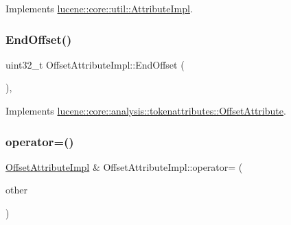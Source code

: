 Implements \mbox{\hyperlink{classlucene_1_1core_1_1util_1_1AttributeImpl_a135318ad4c7c17b3d85e625e32fb42cd}{lucene\+::core\+::util\+::\+Attribute\+Impl}}.

\mbox{\label{classlucene_1_1core_1_1analysis_1_1tokenattributes_1_1OffsetAttributeImpl_a1e70ec558f605ea2313e41ba5c64e379}} 
\subsubsection{\texorpdfstring{End\+Offset()}{EndOffset()}}
{\footnotesize\ttfamily uint32\+\_\+t Offset\+Attribute\+Impl\+::\+End\+Offset (\begin{DoxyParamCaption}{ }\end{DoxyParamCaption})\hspace{0.3cm}{\ttfamily [override]}, {\ttfamily [virtual]}}



Implements \mbox{\hyperlink{classlucene_1_1core_1_1analysis_1_1tokenattributes_1_1OffsetAttribute_ada281ff6240e1a0fecf57707329ec974}{lucene\+::core\+::analysis\+::tokenattributes\+::\+Offset\+Attribute}}.

\mbox{\label{classlucene_1_1core_1_1analysis_1_1tokenattributes_1_1OffsetAttributeImpl_ad5aee8c4731cfda2c9a1c7b7dbe4dc30}} 
\subsubsection{\texorpdfstring{operator=()}{operator=()}\hspace{0.1cm}{\footnotesize\ttfamily [1/2]}}
{\footnotesize\ttfamily \mbox{\hyperlink{classlucene_1_1core_1_1analysis_1_1tokenattributes_1_1OffsetAttributeImpl}{Offset\+Attribute\+Impl}} \& Offset\+Attribute\+Impl\+::operator= (\begin{DoxyParamCaption}\item[{\mbox{\hyperlink{ZlibCrc32_8h_a2c212835823e3c54a8ab6d95c652660e}{const}} \mbox{\hyperlink{classlucene_1_1core_1_1util_1_1AttributeImpl}{lucene\+::core\+::util\+::\+Attribute\+Impl}} \&}]{other }\end{DoxyParamCaption})\hspace{0.3cm}{\ttfamily [virtual]}}



